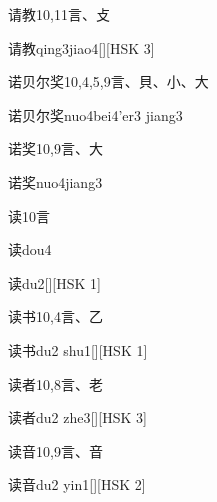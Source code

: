 \begin{entry}{请教}{10,11}{⾔、⽁}
  \begin{phonetics}{请教}{qing3jiao4}[][HSK 3]
  \end{phonetics}
\end{entry}

\begin{entry}{诺贝尔奖}{10,4,5,9}{⾔、⾙、⼩、⼤}
  \begin{phonetics}{诺贝尔奖}{nuo4bei4'er3 jiang3}
  \end{phonetics}
\end{entry}

\begin{entry}{诺奖}{10,9}{⾔、⼤}
  \begin{phonetics}{诺奖}{nuo4jiang3}
  \end{phonetics}
\end{entry}

\begin{entry}{读}{10}{⾔}
  \begin{phonetics}{读}{dou4}
  \end{phonetics}
  \begin{phonetics}{读}{du2}[][HSK 1]
  \end{phonetics}
\end{entry}

\begin{entry}{读书}{10,4}{⾔、⼄}
  \begin{phonetics}{读书}{du2 shu1}[][HSK 1]
  \end{phonetics}
\end{entry}

\begin{entry}{读者}{10,8}{⾔、⽼}
  \begin{phonetics}{读者}{du2 zhe3}[][HSK 3]
  \end{phonetics}
\end{entry}

\begin{entry}{读音}{10,9}{⾔、⾳}
  \begin{phonetics}{读音}{du2 yin1}[][HSK 2]
  \end{phonetics}
\end{entry}

